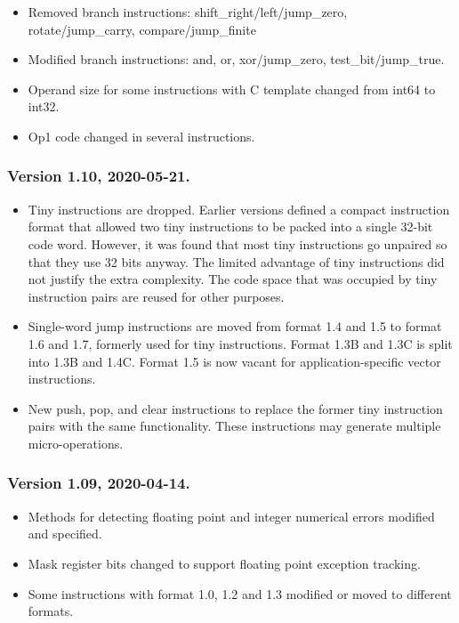 \documentclass[forwardcom.tex]{subfiles}
\begin{document}
\begin{itemize}
\item Removed branch instructions: shift\_right/left/jump\_zero, 
rotate/jump\_carry, compare/jump\_finite

\item Modified branch instructions: and, or, xor/jump\_zero, test\_bit/jump\_true.

\item Operand size for some instructions with C template changed from int64 to int32.

\item Op1 code changed in several instructions.

\end{itemize}


\subsubsection{Version 1.10, 2020-05-21.}

\begin{itemize}
\item Tiny instructions are dropped. Earlier versions defined a compact instruction format that allowed two tiny instructions to be packed into a single 32-bit code word. However, it was found that most tiny instructions go unpaired so that they use 32 bits anyway. The limited advantage of tiny instructions did not justify the extra complexity. The code space that was occupied by tiny instruction pairs are reused for other purposes.

\item Single-word jump instructions are moved from format 1.4 and 1.5 to format 1.6 and 1.7, formerly used for tiny instructions. Format 1.3B and 1.3C is split into 1.3B and 1.4C. Format 1.5 is now vacant for application-specific vector instructions.

\item New push, pop, and clear instructions to replace the former tiny instruction pairs with the same functionality. These instructions may generate multiple micro-operations.

\end{itemize}


\subsubsection{Version 1.09, 2020-04-14.}

\begin{itemize}
\item Methods for detecting floating point and integer numerical errors modified and specified.
\item Mask register bits changed to support floating point exception tracking.
\item Some instructions with format 1.0, 1.2 and 1.3 modified or moved to different formats.
\end{itemize}
\end{document}
